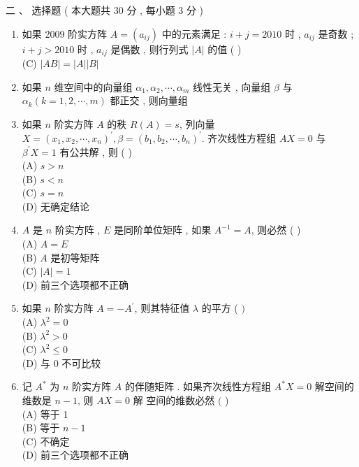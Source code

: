\documentclass[10pt]{article}
\begin{document}
{\begin{enumerate}
\end{enumerate}
 二 、 选择题 ( 本大题共  30  分 ,  每小题  3  分 )

\begin{enumerate}
  \item  如果  2009  阶实方阵  $A=\left(a_{i j}\right)$  中的元素满足 : $i+j=2010$  时 , $a_{i j}$  是奇数 ; $i+j>2010$  时 , $a_{i j}$  是偶数 ,  则行列式  $|A|$  的值 ( )\\
(C) $|A B|=|A||B|$

  \item  如果  $n$  维空间中的向量组  $\alpha_{1}, \alpha_{2}, \cdots, \alpha_{m}$  线性无关 ,  向量组  $\beta$  与  $\alpha_{k}(k=1,2, \cdots, m)$  都正交 ,  则向量组 

  \item  如果  $n$  阶实方阵  $A$  的秩  $R(A)=s$,  列向量  $X=\left(x_{1}, x_{2}, \cdots, x_{n}\right)^{\prime}, \beta=\left(b_{1}, b_{2}, \cdots, b_{n}\right)^{\prime}$.  齐次线性方程组  $A X=0$  与  $\beta^{\prime} X=1$  有公共解 ,  则 ( )\\
(A) $s>n$\\
(B) $s<n$\\
(C) $s=n$\\
(D)  无确定结论 

  \item $A$  是  $n$  阶实方阵 , $E$  是同阶单位矩阵 ,  如果  $A^{-1}=A$,  则必然  ( )\\
(A) $A=E$\\
(B) $A$  是初等矩阵 \\
(C) $|A|=1$\\
(D)  前三个选项都不正确 

  \item  如果  $n$  阶实方阵  $A=-A^{\prime}$,  则其特征值  $\lambda$  的平方 ( $)$\\
(A) $\lambda^{2}=0$\\
(B) $\lambda^{2}>0$\\
(C) $\lambda^{2} \leq 0$\\
(D)  与  0  不可比较 

  \item  记  $A^{*}$  为  $n$  阶实方阵  $A$  的伴随矩阵 .  如果齐次线性方程组  $A^{*} X=0$  解空间的维数是  $n-1$,  则  $A X=0$  解   空间的维数必然  $($ )\\
(A)  等于  1\\
(B)  等于  $n-1$\\
(C)  不确定 \\
(D)  前三个选项都不正确 


\end{enumerate}}
\end{document}

